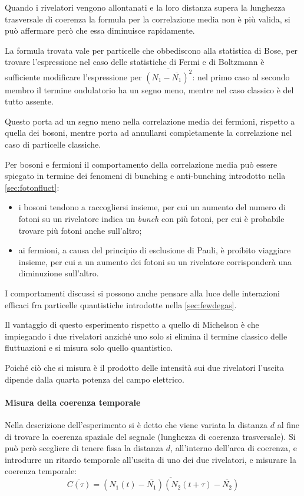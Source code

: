 Quando i rivelatori vengono allontanati e la loro distanza supera la lunghezza trasversale di coerenza la formula per la correlazione media non è più valida, si può affermare però che essa diminuisce rapidamente.

\begin{oss}
	La formula trovata vale per particelle che obbediscono alla statistica di Bose, per trovare l'espressione nel caso delle statistiche di Fermi e di Boltzmann è sufficiente modificare l'espressione per $ \overline{(N_1 - \overline{N_1})^2} $: nel primo caso al secondo membro il termine ondulatorio ha un segno meno, mentre nel caso classico è del tutto assente.
	
	Questo porta ad un segno meno nella correlazione media dei fermioni, rispetto a quella dei bosoni, mentre porta ad annullarsi completamente la correlazione nel caso di particelle classiche.
\end{oss}

Per bosoni e fermioni il comportamento della correlazione media può essere spiegato in termine dei fenomeni di bunching e anti-bunching introdotto nella \cref{sec:fotonfluct}:
\begin{itemize}
	\item i bosoni tendono a raccogliersi insieme, per cui un aumento del numero di fotoni su un rivelatore indica un \textit{bunch} con più fotoni, per cui è probabile trovare più fotoni anche sull'altro;
	\item ai fermioni, a causa del principio di esclusione di Pauli, è proibito viaggiare insieme, per cui a un aumento dei fotoni su un rivelatore corrisponderà una diminuzione sull'altro.
\end{itemize}
I comportamenti discussi si possono anche pensare alla luce delle interazioni efficaci fra particelle quantistiche introdotte nella \cref{sec:fewdegas}.
\newline

Il vantaggio di questo esperimento rispetto a quello di Michelson è che impiegando i due rivelatori anziché uno solo si elimina il termine classico delle fluttuazioni e si misura solo quello quantistico.

Poiché ciò che si misura è il prodotto delle intensità sui due rivelatori l'uscita dipende dalla quarta potenza del campo elettrico.

\paragraph{Misura della coerenza temporale} Nella descrizione dell'esperimento si è detto che viene variata la distanza $ d $ al fine di trovare la coerenza spaziale del segnale (lunghezza di coerenza trasversale).
Si può però scegliere di tenere fissa la distanza $ d $, all'interno dell'area di coerenza, e introdurre un ritardo temporale all'uscita di uno dei due rivelatori, e misurare la coerenza temporale:
\[ \overline{C(\tau)} = \overline{(N_1(t) - \overline{N_1})  (N_2(t+\tau) - \overline{N_2})} \]

